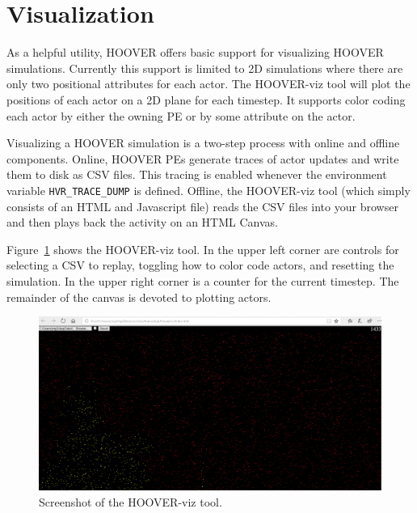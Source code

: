 \section{Visualization}

As a helpful utility, HOOVER offers basic support for visualizing HOOVER
simulations. Currently this support is limited to 2D simulations where there are
only two positional attributes for each actor. The HOOVER-viz tool will plot the
positions of each actor on a 2D plane for each timestep. It supports color
coding each actor by either the owning PE or by some attribute on the actor.

Visualizing a HOOVER simulation is a two-step process with online and offline
components. Online, HOOVER PEs generate traces of actor updates and write them
to disk as CSV files. This tracing is enabled whenever the environment variable
\texttt{HVR\_TRACE\_DUMP} is defined. Offline, the HOOVER-viz tool (which simply
consists of an HTML and Javascript file) reads the CSV files into your browser
and then plays back the activity on an HTML Canvas.

Figure~\ref{fig:hoover-viz} shows the HOOVER-viz tool. In the upper left corner
are controls for selecting a CSV to replay, toggling how to color code actors,
and resetting the simulation. In the upper right corner is a counter for the
current timestep. The remainder of the canvas is devoted to plotting actors.

\begin{figure}
\centering
\includegraphics[width=\columnwidth]{hoover-viz.png}
\caption{Screenshot of the HOOVER-viz tool.}
\label{fig:hoover-viz}
\end{figure}

